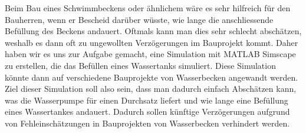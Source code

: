 Beim Bau eines Schwimmbeckens oder ähnlichem wäre es sehr hilfreich für den 	Bauherren, wenn er Bescheid darüber wüsste, wie lange die anschliessende 		Befüllung des Beckens andauert. Oftmals kann man dies sehr schlecht 			abschätzen, weshalb es dann oft zu ungewollten Verzögerungen im 				Bauprojekt kommt. Daher haben wir es uns zur Aufgabe gemacht, eine 				Simulation mit MATLAB Simscape zu erstellen, die das Befüllen eines 			Wassertanks simuliert. Diese Simulation könnte dann auf verschiedene 			Bauprojekte von Wasserbecken angewandt werden.\\

Ziel dieser Simulation soll also sein, dass man dadurch einfach Abschätzen 		kann, was die Wasserpumpe für einen Durchsatz liefert und wie lange eine 		Befüllung eines Wassertankes andauert. Dadurch sollen künftige 					Verzögerungen aufgrund von Fehleinschätzungen in Bauprojekten von 				Wasserbecken verhindert werden.